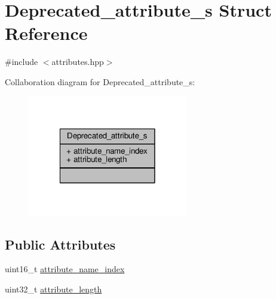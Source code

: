 \hypertarget{structDeprecated__attribute__s}{\section{Deprecated\+\_\+attribute\+\_\+s Struct Reference}
\label{structDeprecated__attribute__s}
}


{\ttfamily \#include $<$attributes.\+hpp$>$}



Collaboration diagram for Deprecated\+\_\+attribute\+\_\+s\+:\nopagebreak
\begin{figure}[H]
\begin{center}
\leavevmode
\includegraphics[width=198pt]{structDeprecated__attribute__s__coll__graph}
\end{center}
\end{figure}
\subsection*{Public Attributes}
\begin{DoxyCompactItemize}
\item 
uint16\+\_\+t \hyperlink{structDeprecated__attribute__s_ad8fd16bc95d09719922224c303248ca9}{attribute\+\_\+name\+\_\+index}
\item 
uint32\+\_\+t \hyperlink{structDeprecated__attribute__s_a5c1b473858ed1435598d5ce11ae8a0c3}{attribute\+\_\+length}
\end{DoxyCompactItemize}


